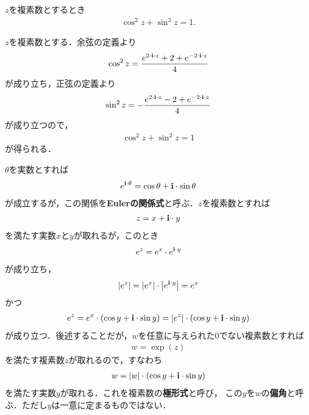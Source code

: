 	\begin{screen}
		\begin{thm}[余弦と正弦の二乗和は$1$]
			$z$を複素数とするとき
			\begin{align}
				\cos^2{z} + \sin^2{z} = 1.
			\end{align}
		\end{thm}
	\end{screen}
	
	\begin{sketch}
		$z$を複素数とする．余弦の定義より
		\begin{align}
			\cos^2{z} = \frac{e^{2 \cdot \mathbf{i} \cdot z} + 2 + e^{-2 \cdot \mathbf{i} \cdot z}}{4}
		\end{align}
		が成り立ち，正弦の定義より
		\begin{align}
			\sin^2{z} = -\frac{e^{2 \cdot \mathbf{i} \cdot z} - 2 + e^{-2 \cdot \mathbf{i} \cdot z}}{4}
		\end{align}
		が成り立つので，
		\begin{align}
			\cos^2{z} + \sin^2{z} = 1
		\end{align}
		が得られる．
		\QED
	\end{sketch}
	
	$\theta$を実数とすれば
	\begin{align}
		e^{\mathbf{i} \cdot \theta} = \cos{\theta} + \mathbf{i} \cdot \sin{\theta}
	\end{align}
	が成立するが，この関係を{\bf Eulerの関係式}と呼ぶ．$z$を複素数とすれば
	\begin{align}
		z = x + \mathbf{i} \cdot y
	\end{align}
	を満たす実数$x$と$y$が取れるが，このとき
	\begin{align}
		e^z = e^x \cdot e^{\mathbf{i} \cdot y}
	\end{align}
	が成り立ち，
	\begin{align}
		\left|e^z\right| = \left|e^x\right| \cdot \left|e^{\mathbf{i} \cdot y}\right| = e^x
	\end{align}
	かつ
	\begin{align}
		e^z = e^x \cdot (\cos{y} + \mathbf{i} \cdot \sin{y}) = \left|e^z\right| \cdot (\cos{y} + \mathbf{i} \cdot \sin{y})
	\end{align}
	が成り立つ．後述することだが，$w$を任意に与えられた$0$でない複素数とすれば
	\begin{align}
		w = \exp{(z)}
	\end{align}
	を満たす複素数$z$が取れるので，すなわち
	\begin{align}
		w = |w| \cdot (\cos{y} + \mathbf{i} \cdot \sin{y})
	\end{align}
	を満たす実数$y$が取れる．これを複素数の{\bf 極形式}と呼び，
	この$y$を$w$の{\bf 偏角}と呼ぶ．ただし$y$は一意に定まるものではない．
	